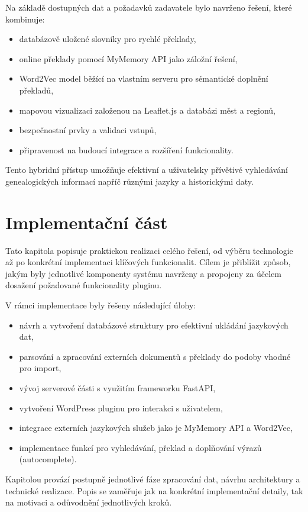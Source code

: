 \documentclass[czech, ba, kiv, he]{fasthesis}
\begin{document}
Na základě dostupných dat a požadavků zadavatele bylo navrženo řešení, které kombinuje:
\begin{itemize}
    \item databázově uložené slovníky pro rychlé překlady,
    \item online překlady pomocí MyMemory API jako záložní řešení,
    \item Word2Vec model běžící na vlastním serveru pro sémantické doplnění překladů,
    \item mapovou vizualizaci založenou na Leaflet.js a databázi měst a regionů,
    \item bezpečnostní prvky a validaci vstupů,
    \item připravenost na budoucí integrace a rozšíření funkcionality.
\end{itemize}

Tento hybridní přístup umožňuje efektivní a uživatelsky přívětivé vyhledávání genealogických informací napříč různými jazyky a historickými daty.



\chapter{Implementační část}

Tato kapitola popisuje praktickou realizaci celého řešení, od výběru technologie až po konkrétní implementaci klíčových funkcionalit. Cílem je přiblížit způsob, jakým byly jednotlivé komponenty systému navrženy a propojeny za účelem dosažení požadované funkcionality pluginu.

V rámci implementace byly řešeny následující úlohy:
\begin{itemize}
    \item návrh a vytvoření databázové struktury pro efektivní ukládání jazykových dat,
    \item parsování a zpracování externích dokumentů s překlady do podoby vhodné pro import,
    \item vývoj serverové části s využitím frameworku FastAPI,
    \item vytvoření WordPress pluginu pro interakci s uživatelem,
    \item integrace externích jazykových služeb jako je MyMemory API a Word2Vec,
    \item implementace funkcí pro vyhledávání, překlad a doplňování výrazů (autocomplete).
\end{itemize}

Kapitolou provází postupně jednotlivé fáze zpracování dat, návrhu architektury a technické realizace. Popis se zaměřuje jak na konkrétní implementační detaily, tak na motivaci a odůvodnění jednotlivých kroků.
\end{document}
